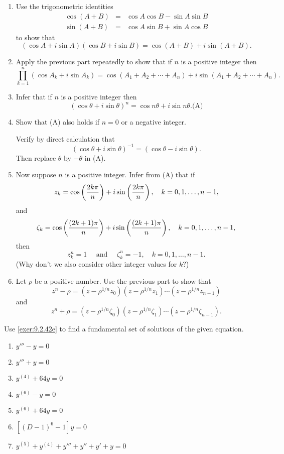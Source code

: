 \documentclass{ximera}
\begin{document}
\begin{problem}\label{exer:9.2.42}
\begin{enumerate}
\item %
Use the trigonometric identities
\begin{eqnarray*}
\cos(A+B)&=&\cos A\cos B-\sin A\sin B\\
\sin(A+B)&=&\cos A\sin B+\sin A\cos B
\end{eqnarray*}
to show that
$$
(\cos A+i\sin A)(\cos B+i\sin B)=\cos(A+B)+i\sin(A+B).
$$
\item %
Apply the previous part repeatedly to show that if $n$ is a positive
integer then
$$
\prod_{k=1}^n(\cos A_k+i\sin A_k)=\cos(A_1+A_2+\cdots+A_n)
+i\sin(A_1+A_2+\cdots+A_n).
$$
\item %
Infer that if $n$ is a positive integer then
$$
(\cos\theta+i\sin\theta)^n=\cos n\theta+i\sin n\theta.
\text{(A)}
$$
\item %
Show that (A) also holds if $n=0$ or a negative integer.
\begin{hint}
Verify by direct calculation that
$$
(\cos\theta+i\sin\theta)^{-1}=(\cos\theta-i\sin\theta).
$$
Then replace $\theta$ by $-\theta$  in (A).
\end{hint}
\item\label{exer:9.2.42e} %
Now suppose $n$ is a positive integer. Infer from (A)
that if
$$
z_k=\cos\left(2k\pi\over n\right)+i\sin\left(2k\pi\over n\right)
,\quad k=0,1,\dots,n-1,
$$
and
$$
\zeta_k=\cos\left((2k+1)\pi\over
n\right)+i\sin\left((2k+1)\pi\over n\right)
,\quad k=0,1,\dots,n-1,
$$
then
$$
z_k^n=1\quad\mbox{ and }\quad\zeta_k^n=-1,\quad k=0,1,\dots,n-1.
$$
(Why don't we also consider other integer values for $k$?)

\item %
Let $\rho$ be a positive number. Use the previous part to show that
$$
z^n-\rho=(z-\rho^{1/n} z_0)(z-\rho^{1/n}z_1)\cdots(z-\rho^{1/n} z_{n-1})
$$
and
$$
z^n+\rho=(z-\rho^{1/n} \zeta_0)(z-\rho^{1/n} \zeta_1)\cdots(z-\rho^{1/n}
\zeta_{n-1}).
$$
\end{enumerate}
\end{problem}

\begin{problem}\label{exer:9.2.43}
Use \ref{exer:9.2.42e} to find a fundamental set of
solutions of the given equation.

\begin{enumerate}
\item $y'''-y=0$
\item $y'''+y=0$
\item $y^{(4)}+64y=0$
\item $y^{(6)}-y=0$
\item $y^{(6)}+64y=0$
\item $\left[(D-1)^6-1\right]y=0$
\item $y^{(5)}+y^{(4)}+y'''+y''+y'+y=0$
\end{enumerate}
\end{problem}
\end{document}
